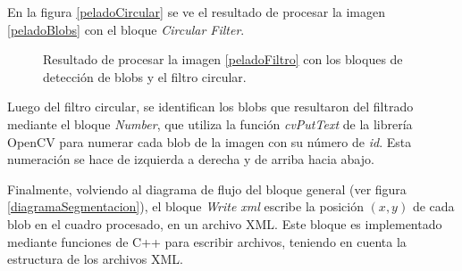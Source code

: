 En la figura \ref{peladoCircular} se ve el resultado de procesar la imagen \ref{peladoBlobs} con el bloque \emph{Circular Filter}.

\begin{figure}[H]
        \centering
         
  \caption{Resultado de procesar la imagen \ref{peladoFiltro} con los bloques de detección de blobs y el filtro circular.}
      \label{ejemplocircularfilter}
\end{figure}

Luego del filtro circular, se identifican los blobs que resultaron del filtrado mediante el bloque \emph{Number}, que utiliza la función \emph{cvPutText} de la librería  OpenCV\cite{opencv} para numerar cada blob de la imagen con su número de \textit{id}. Esta numeración se hace de izquierda a derecha y de arriba hacia abajo.

\vspace{10 mm}
Finalmente, volviendo al diagrama de flujo del bloque general (ver figura \ref{diagramaSegmentacion}), el bloque \emph{Write xml} escribe la posición $(x,y)$ de cada blob en el cuadro procesado, en un archivo XML\cite{xml}. Este bloque es implementado mediante funciones de C++ para escribir archivos, teniendo en cuenta la estructura de los archivos XML\cite{xml}.


